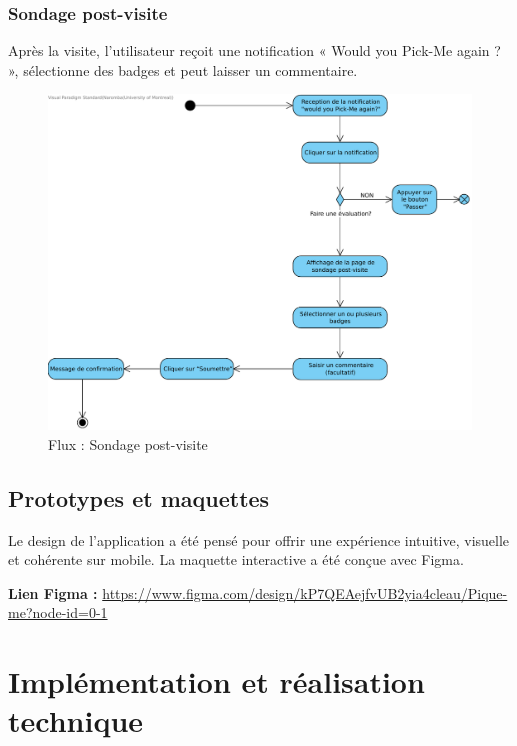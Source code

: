 \documentclass[12pt,a4paper]{article}
\begin{document}
\subsubsection{Sondage post-visite}

Après la visite, l'utilisateur reçoit une notification « Would you Pick-Me again ? », sélectionne des badges et peut laisser un commentaire.

\begin{figure}[h!]
  \centering
  \includegraphics[width=0.9\linewidth]{attachments/Sondage_post_visite.pdf}
  \caption{Flux : Sondage post-visite}
\end{figure}

\subsection{Prototypes et maquettes}

Le design de l'application a été pensé pour offrir une expérience intuitive, visuelle et cohérente sur mobile. La maquette interactive a été conçue avec Figma.

\vspace{0.5em}
\noindent\textbf{Lien Figma :} \url{https://www.figma.com/design/kP7QEAejfvUB2yia4cleau/Pique-me?node-id=0-1}



\clearpage
\section{Implémentation et réalisation technique}
\end{document}
